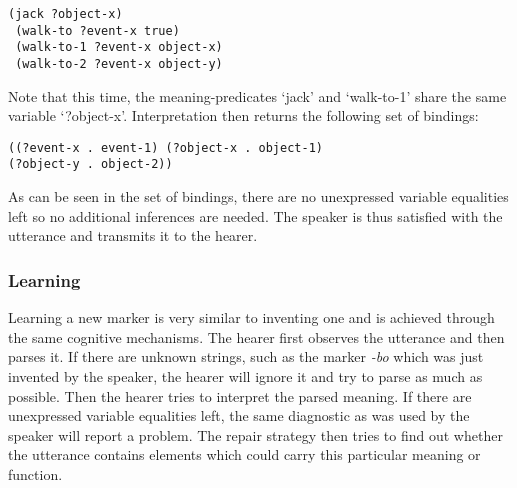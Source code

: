 \ea
\begin{lstlisting}
(jack ?object-x)
 (walk-to ?event-x true)
 (walk-to-1 ?event-x object-x)
 (walk-to-2 ?event-x object-y)
\end{lstlisting}
\z

Note that this time, the meaning-predicates `jack' and `walk-to-1' share the same variable `?object-x'. Interpretation then returns the following set of bindings:

\ea
{\footnotesize\tt{((?event-x . event-1) (?object-x . object-1) \\ \hspace{3,3mm}(?object-y . object-2))}}
\z

As can be seen in the set of bindings, there are no unexpressed variable equalities left so no additional inferences are needed. The speaker is thus satisfied with the utterance and transmits it to the hearer.


\subsubsection{Learning}
 Learning a new marker is very similar to inventing one and is achieved through the same cognitive mechanisms. The hearer first observes the utterance and then parses it. If there are unknown strings, such as the marker {\em -bo} which was just invented by the speaker, the hearer will ignore it and try to parse as much as possible. Then the hearer tries to interpret the parsed meaning. If there are unexpressed variable equalities left, the same diagnostic as was used by the speaker will report a problem. The repair strategy then tries to find out whether the utterance contains elements which could carry this particular meaning or function.


